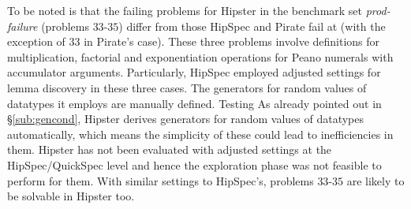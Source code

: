 To be noted is that the failing problems for Hipster in the benchmark set \emph{prod-failure} (problems $33$-$35$) differ from those HipSpec and Pirate fail at (with the exception of $33$ in Pirate's case).
%
These three problems involve definitions for multiplication, factorial and exponentiation operations for Peano numerals with accumulator arguments.
%
Particularly, HipSpec employed adjusted settings for lemma discovery in these three cases.%
%
The generators for random values of datatypes it employs are manually defined.
%
Testing
As already pointed out in \S \ref{sub:gencond}, Hipster derives generators for random values of datatypes automatically, which means the simplicity of these could lead to inefficiencies in them.
%
Hipster has not been evaluated with adjusted settings at the HipSpec/QuickSpec level and hence the exploration phase was not feasible to perform for them.
%
With similar settings to HipSpec's, problems $33$-$35$ are likely to be solvable in Hipster too.

